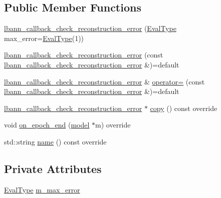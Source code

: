 \subsection*{Public Member Functions}
\begin{DoxyCompactItemize}
\item 
\hyperlink{classlbann_1_1lbann__callback__check__reconstruction__error_aaed51def6fe5ba7093e3d2cc41637a2a}{lbann\+\_\+callback\+\_\+check\+\_\+reconstruction\+\_\+error} (\hyperlink{base_8hpp_a3266f5ac18504bbadea983c109566867}{Eval\+Type} max\+\_\+error=\hyperlink{base_8hpp_a3266f5ac18504bbadea983c109566867}{Eval\+Type}(1))
\item 
\hyperlink{classlbann_1_1lbann__callback__check__reconstruction__error_ad277f418a2c28db941ab44398ee8be5e}{lbann\+\_\+callback\+\_\+check\+\_\+reconstruction\+\_\+error} (const \hyperlink{classlbann_1_1lbann__callback__check__reconstruction__error}{lbann\+\_\+callback\+\_\+check\+\_\+reconstruction\+\_\+error} \&)=default
\item 
\hyperlink{classlbann_1_1lbann__callback__check__reconstruction__error}{lbann\+\_\+callback\+\_\+check\+\_\+reconstruction\+\_\+error} \& \hyperlink{classlbann_1_1lbann__callback__check__reconstruction__error_aef722b1c0145d58928389c0ca3464ee6}{operator=} (const \hyperlink{classlbann_1_1lbann__callback__check__reconstruction__error}{lbann\+\_\+callback\+\_\+check\+\_\+reconstruction\+\_\+error} \&)=default
\item 
\hyperlink{classlbann_1_1lbann__callback__check__reconstruction__error}{lbann\+\_\+callback\+\_\+check\+\_\+reconstruction\+\_\+error} $\ast$ \hyperlink{classlbann_1_1lbann__callback__check__reconstruction__error_a7c2367fdebae1798c6cbf2846c7492a3}{copy} () const override
\item 
void \hyperlink{classlbann_1_1lbann__callback__check__reconstruction__error_a8a6a72b8016d3ba3ad11b5e7e2f3f5df}{on\+\_\+epoch\+\_\+end} (\hyperlink{classlbann_1_1model}{model} $\ast$m) override
\item 
std\+::string \hyperlink{classlbann_1_1lbann__callback__check__reconstruction__error_a604bb361e11774cb5d047d65a5d6508e}{name} () const override
\end{DoxyCompactItemize}
\subsection*{Private Attributes}
\begin{DoxyCompactItemize}
\item 
\hyperlink{base_8hpp_a3266f5ac18504bbadea983c109566867}{Eval\+Type} \hyperlink{classlbann_1_1lbann__callback__check__reconstruction__error_a04e779b9e10a909f63f941ea036b3ef4}{m\+\_\+max\+\_\+error}
\end{DoxyCompactItemize}
